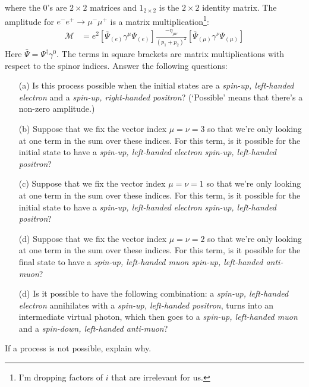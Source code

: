 \documentclass[12pt]{article}
\begin{document}
where the $0$'s are $2\times 2$ matrices and $1_{2\times 2}$ is the $2\times 2$ identity matrix. The amplitude for $e^-e^+ \to \mu^-\mu^+$ is a matrix multiplication\footnote{I'm dropping factors of $i$ that are irrelevant for us.}:
\begin{align}
	\mathcal M &=
	e^2\left[ \bar\Psi_{(e)}\gamma^\mu \Psi_{(e)} \right]
	\frac{-\eta_{\mu\nu}}{(p_1+p_2)^2}
	\left[ \bar\Psi_{(\mu)}\gamma^\nu \Psi_{(\mu)} \right]
\end{align}
Here $\bar\Psi = \Psi^\dag \gamma^0$.  The terms in square brackets are matrix multiplications with respect to the spinor indices. Answer the following questions:
\begin{enumerate}
	\item[(a)] Is this process possible when the initial states are a \emph{spin-up, left-handed electron} and a \emph{spin-up, right-handed positron}? (`Possible' means that there's a non-zero amplitude.)
	\item[(b)] Suppose that we fix the vector index $\mu = \nu = 3$ so that we're only looking at one term in the sum over these indices. For this term, is it possible for the initial state to have a \emph{spin-up, left-handed electron}  \emph{spin-up, left-handed positron}?
	\item[(c)] Suppose that we fix the vector index $\mu = \nu = 1$ so that we're only looking at one term in the sum over these indices. For this term, is it possible for the initial state to have a \emph{spin-up, left-handed electron}  \emph{spin-up, left-handed positron}?
	\item[(d)] Suppose that we fix the vector index $\mu = \nu = 2$ so that we're only looking at one term in the sum over these indices. For this term, is it possible for the final state to have a \emph{spin-up, left-handed muon}  \emph{spin-up, left-handed anti-muon}?
	\item[(d)] Is it possible to have the following combination: a \emph{spin-up, left-handed electron} annihilates with a \emph{spin-up, left-handed positron}, turns into an intermediate virtual photon, which then goes to a \emph{spin-up, left-handed muon} and a \emph{spin-down, left-handed anti-muon}? 
\end{enumerate}
If a process is not possible, explain why.
\end{document}
